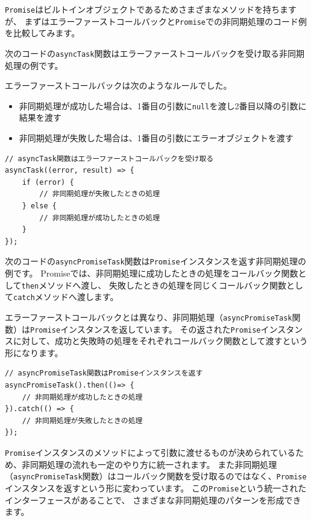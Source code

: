 \texttt{Promise}はビルトインオブジェクトであるためさまざまなメソッドを持ちますが、
まずはエラーファーストコールバックと\texttt{Promise}での非同期処理のコード例を比較してみます。

次のコードの\texttt{asyncTask}関数はエラーファーストコールバックを受け取る非同期処理の例です。

エラーファーストコールバックは次のようなルールでした。

\begin{itemize}
\item
  非同期処理が成功した場合は、1番目の引数に\texttt{null}を渡し2番目以降の引数に結果を渡す
\item
  非同期処理が失敗した場合は、1番目の引数にエラーオブジェクトを渡す
\end{itemize}

\begin{lstlisting}
// asyncTask関数はエラーファーストコールバックを受け取る
asyncTask((error, result) => {
    if (error) {
        // 非同期処理が失敗したときの処理
    } else {
        // 非同期処理が成功したときの処理
    }
});
\end{lstlisting}

次のコードの\texttt{asyncPromiseTask}関数は\texttt{Promise}インスタンスを返す非同期処理の例です。
Promiseでは、非同期処理に成功したときの処理をコールバック関数として\texttt{then}メソッドへ渡し、
失敗したときの処理を同じくコールバック関数として\texttt{catch}メソッドへ渡します。

エラーファーストコールバックとは異なり、非同期処理（\texttt{asyncPromiseTask}関数）は\texttt{Promise}インスタンスを返しています。
その返された\texttt{Promise}インスタンスに対して、成功と失敗時の処理をそれぞれコールバック関数として渡すという形になります。

\begin{lstlisting}
// asyncPromiseTask関数はPromiseインスタンスを返す
asyncPromiseTask().then(()=> {
    // 非同期処理が成功したときの処理
}).catch(() => {
    // 非同期処理が失敗したときの処理
});
\end{lstlisting}

\texttt{Promise}インスタンスのメソッドによって引数に渡せるものが決められているため、非同期処理の流れも一定のやり方に統一されます。
また非同期処理（\texttt{asyncPromiseTask}関数）はコールバック関数を受け取るのではなく、\texttt{Promise}インスタンスを返すという形に変わっています。
この\texttt{Promise}という統一されたインターフェースがあることで、
さまざまな非同期処理のパターンを形成できます。

